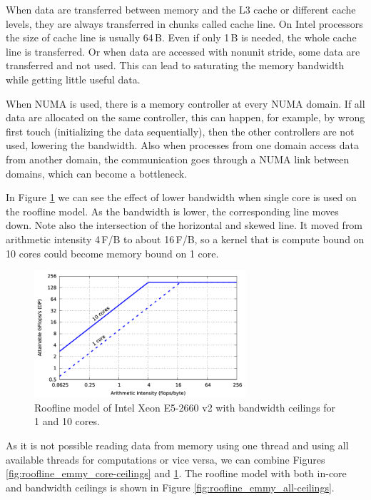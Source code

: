 When data are transferred between memory and the L3 cache or different cache levels, they are always transferred in chunks called cache line. On Intel processors the size of cache line is usually 64\,B. Even if only 1\,B is needed, the whole cache line is transferred. Or when data are accessed with nonunit stride, some data are transferred and not used. This can lead to saturating the memory bandwidth while getting little useful data.

When NUMA is used, there is a memory controller at every NUMA domain. If all data are allocated on the same controller, this can happen, for example, by wrong first touch (initializing the data sequentially), then the other controllers are not used, lowering the bandwidth. Also when processes from one domain access data from another domain, the communication goes through a NUMA link between domains, which can become a bottleneck.

In Figure \ref{fig:roofline_emmy_memory-ceilings} we can see the effect of lower bandwidth when single core is used on the roofline model. As the bandwidth is lower, the corresponding line moves down. Note also the intersection of the horizontal and skewed line. It moved from arithmetic intensity 4\,F/B to about 16\,F/B, so a kernel that is compute bound on 10 cores could become memory bound on 1 core.

\begin{figure}[t]
   \centering
   \includegraphics[width=0.7\textwidth,clip=true]{images/roofline/roofline_emmy_Xeon2660v2_memory-ceilings.pdf}
   \caption{Roofline model of Intel Xeon E5-2660 v2 with bandwidth ceilings for 1 and 10 cores.}
  \label{fig:roofline_emmy_memory-ceilings}
\end{figure}

As it is not possible reading data from memory using one thread and using all available threads for computations or vice versa, we can combine Figures \ref{fig:roofline_emmy_core-ceilings} and \ref{fig:roofline_emmy_memory-ceilings}. The roofline model with both in-core and bandwidth ceilings is shown in Figure \ref{fig:roofline_emmy_all-ceilings}.

